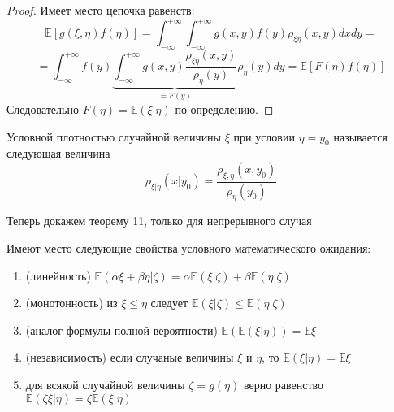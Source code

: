 \begin{proof}
Имеет место цепочка равенств:
\[
    \mathbb{E} \left[g\left(\xi, \eta\right) f\left(\eta\right)\right] = \int_{-\infty}^{+\infty} \int_{-\infty}^{+\infty} g\left(x, y\right) f\left(y\right) \rho_{\xi \eta}\left(x, y\right) dx dy  = \]
    \[
    = \int_{-\infty}^{+\infty} f\left(y\right) \underbrace{\int_{-\infty}^{+\infty}g\left(x, y\right)\frac{\rho_{\xi \eta}\left(x, y\right)}{\rho_{\eta}\left(y\right)}}_{= F\left(y\right)} \rho_{\eta}\left(y\right) dy = \mathbb{E} \left[F\left(\eta\right) f\left(\eta\right)\right]
\]
Следовательно $F\left(\eta\right) = \mathbb{E} \left(\xi | \eta\right)$ по определению.
\end{proof}

\begin{definition}
$\textit{Условной плотностью}$ случайной величины $\xi$ при условии $\eta = y_0$ называется следующая величина
\[
    \rho_{\xi|\eta}\left(x | y_0\right) = \frac{\rho_{\xi,\eta}\left(x, y_0\right)}{\rho_{\eta}\left(y_0\right)}
\]
\end{definition}

Теперь докажем теорему 11, только для непрерывного случая 
\begin{theorem}
Имеют место следующие свойства условного математического ожидания:
\begin{enumerate}[label=(\arabic*)]
\item (линейность) $\mathbb{E}\left(\alpha \xi + \beta \eta | \zeta\right) = \alpha \mathbb{E}\left(\xi | \zeta\right) + \beta \mathbb{E}\left(\eta | \zeta\right)$
\item (монотонность) из $\xi \leq \eta$ следует $\mathbb{E}\left(\xi | \zeta\right) \leq \mathbb{E}\left(\eta | \zeta\right)$
\item (аналог формулы полной вероятности) $\mathbb{E}\left(\mathbb{E}\left(\xi | \eta\right)\right) = \mathbb{E}\xi$
\item (независимость) если случаные величины $\xi$ и $\eta$, то $\mathbb{E}\left(\xi | \eta\right) = \mathbb{E} \xi$
\item для всякой случайной величины $\zeta = g\left(\eta\right)$ верно равенство
$\mathbb{E}\left(\zeta \xi | \eta\right) = \zeta \mathbb{E}\left(\xi | \eta\right)$

\end{enumerate}
\end{theorem}

